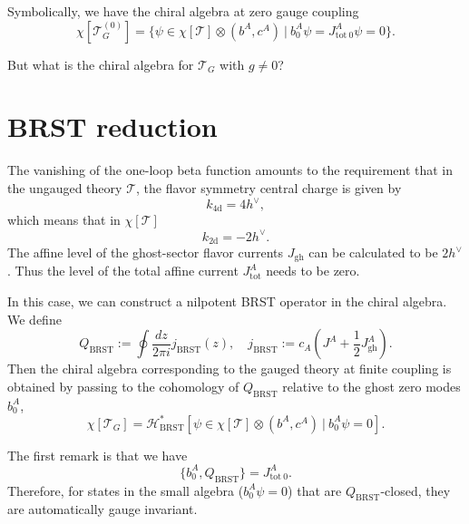 \documentclass[a4paper,11pt]{article}
\begin{document}
Symbolically, we have the chiral algebra at zero gauge coupling
\begin{equation}
    \chi[\mathcal{T}_G^{(0)}] = \{\psi \in \chi[\mathcal{T}] \otimes (b^A, c^A) \:|\: b_0^A \psi = J^A_{\mathrm{tot}~0} \psi = 0\}.
\end{equation}

But what is the chiral algebra for $\mathcal{T}_G$ with $g \neq 0$?

\section{BRST reduction}
The vanishing of the one-loop beta function amounts to the requirement that in the ungauged theory $\mathcal{T}$, the flavor symmetry central charge is given by
\begin{equation}
    k_\mathrm{4d} = 4 h^\vee,
\end{equation}
which means that in $\chi[\mathcal{T}]$
\begin{equation}
    k_\mathrm{2d} = -2 h^\vee.
\end{equation}
The affine level of the ghost-sector flavor currents $J_\mathrm{gh}$ can be calculated to be $2 h^\vee$. Thus the level of the total affine current $J^A_\mathrm{tot}$ needs to be zero.

In this case, we can construct a nilpotent BRST operator in the chiral algebra. We define
\begin{equation}
    Q_\mathrm{BRST} := \oint \frac{dz}{2\pi i} j_\mathrm{BRST}(z), \quad j_\mathrm{BRST} := c_A \left(J^A + \frac{1}{2} J^A_\mathrm{gh}\right).
\end{equation}
Then the chiral algebra corresponding to the gauged theory at finite coupling is obtained by passing to the cohomology of $Q_\mathrm{BRST}$ relative to the ghost zero modes $b_0^A$,
\begin{equation}
    \chi[\mathcal{T}_G] = \mathcal{H}^*_\mathrm{BRST}[\psi \in \chi[\mathcal{T}] \otimes (b^A, c^A) \:|\: b_0^A \psi = 0].
\end{equation}

The first remark is that we have
\begin{equation}
    \{b_0^A, Q_\mathrm{BRST}\} = J^A_{\mathrm{tot}~0}.
\end{equation}
Therefore, for states in the small algebra ($b_0^A \psi = 0$) that are $Q_\mathrm{BRST}$-closed, they are automatically gauge invariant.
\end{document}
